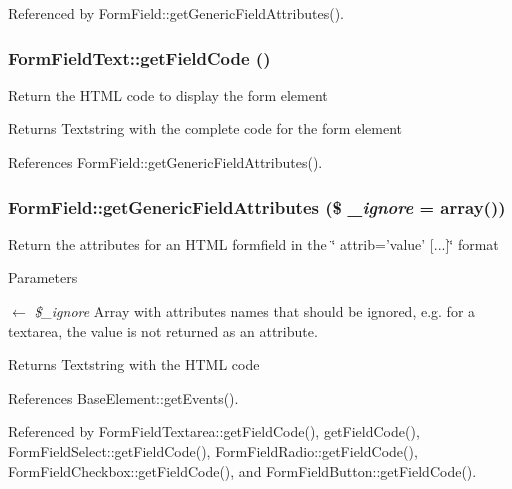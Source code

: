 Referenced by FormField::getGenericFieldAttributes().

\subsubsection[{getFieldCode}]{\setlength{\rightskip}{0pt plus 5cm}FormFieldText::getFieldCode ()}\label{classFormFieldText_aebbf56aba1fd099619a360ac259633fa}
Return the HTML code to display the form element

\begin{DoxyReturn}{Returns}
Textstring with the complete code for the form element 
\end{DoxyReturn}


References FormField::getGenericFieldAttributes().

\subsubsection[{getGenericFieldAttributes}]{\setlength{\rightskip}{0pt plus 5cm}FormField::getGenericFieldAttributes (\$ {\em \_\-ignore} = {\ttfamily array()})}\label{classFormField_a9f9d136ba8b4a793f22370aff43d592d}
Return the attributes for an HTML formfield in the \char`\"{} attrib='value' \mbox{[}...\mbox{]}\char`\"{} format


\begin{DoxyParams}{Parameters}
\item[\mbox{$\leftarrow$} {\em \$\_\-ignore}]Array with attributes names that should be ignored, e.g. for a textarea, the value is not returned as an attribute. \end{DoxyParams}
\begin{DoxyReturn}{Returns}
Textstring with the HTML code 
\end{DoxyReturn}


References BaseElement::getEvents().



Referenced by FormFieldTextarea::getFieldCode(), getFieldCode(), FormFieldSelect::getFieldCode(), FormFieldRadio::getFieldCode(), FormFieldCheckbox::getFieldCode(), and FormFieldButton::getFieldCode().

